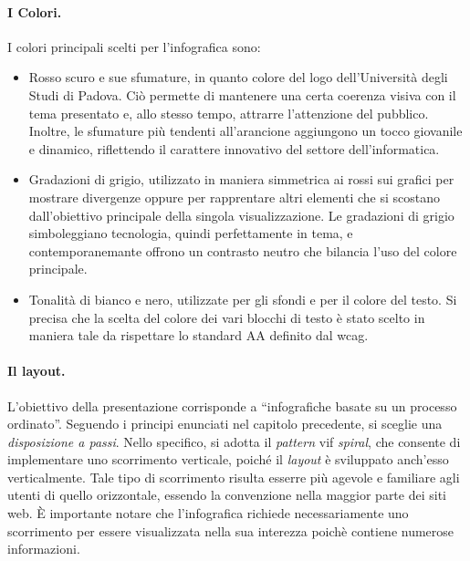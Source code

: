 \paragraph{I Colori.} I colori principali scelti per l'infografica sono:
\begin{itemize}
    \item Rosso scuro e sue sfumature, in quanto colore del logo dell'Università degli Studi di Padova. Ciò permette di mantenere una certa coerenza visiva con il
    tema presentato e, allo stesso tempo, attrarre l'attenzione del pubblico. Inoltre, le sfumature più tendenti all'arancione aggiungono un tocco giovanile e dinamico,
    riflettendo il carattere innovativo del settore dell'informatica.
    \item Gradazioni di grigio, utilizzato in maniera simmetrica ai rossi sui grafici per mostrare divergenze oppure per rapprentare altri elementi che si scostano 
    dall'obiettivo principale della singola visualizzazione. 
    Le gradazioni di grigio simboleggiano tecnologia, quindi perfettamente in tema, e contemporanemante offrono un contrasto neutro che bilancia l'uso del colore 
    principale.
    \item Tonalità di bianco e nero, utilizzate per gli sfondi e per il colore del testo. 
    Si precisa che la scelta del colore dei vari blocchi di testo è stato scelto in maniera tale da rispettare lo standard AA definito dal \gls{wcag}.
\end{itemize}

\paragraph{Il layout.}
L'obiettivo della presentazione corrisponde a ``infografiche basate su un processo ordinato''. Seguendo i principi enunciati nel capitolo precedente, si sceglie una \emph{disposizione 
a passi}. Nello specifico, si adotta il \emph{pattern} \gls{vif} \emph{spiral}, che consente di implementare uno scorrimento verticale, poiché il \emph{layout} è sviluppato anch'esso verticalmente.  
Tale tipo di scorrimento risulta esserre più agevole e familiare agli utenti di quello orizzontale, essendo la convenzione nella maggior parte dei siti web. 
È importante notare che l'infografica richiede necessariamente uno scorrimento per essere visualizzata nella sua interezza poichè contiene numerose informazioni.

